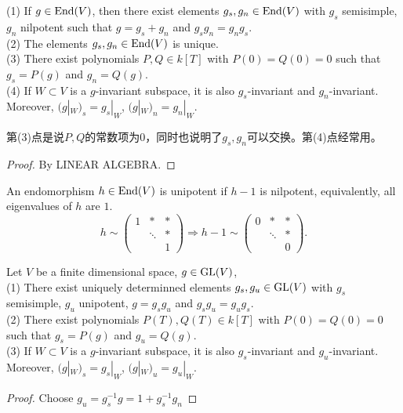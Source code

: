 \begin{prop}
	(1) If $g \in \mathrm{End}(V)$, then there exist elements $g_s,g_n\in \mathrm{End}(V)$ with $g_s$ semisimple, $g_n$ nilpotent such that $g=g_s+g_n$ and $g_sg_n=g_ng_s$.\\
	(2) The elements $g_s,g_n\in \mathrm{End}(V)$ is unique.\\
	(3) There exist polynomials $P,Q\in k[T]$ with $P(0)=Q(0)=0$ such that $g_s=P(g)$ and $g_n=Q(g)$.\\
	(4) If $W\subset V$ is a $g$-invariant subspace, it is also $g_s$-invariant and $g_n$-invariant. Moreover, $(g|_W)_s=g_s|_W$, $(g|_W)_n=g_n|_W$.
\end{prop}
第(3)点是说$P,Q$的常数项为$0$，同时也说明了$g_s,g_n$可以交换。第(4)点经常用。
\begin{proof}
	By LINEAR ALGEBRA.
\end{proof}
\begin{definition}
	An endomorphism $h\in \mathrm{End}(V)$ is unipotent if $h-1$ is nilpotent, equivalently, all eigenvalues of $h$ are $1$.
	\[h\sim  \begin{pmatrix}
	1 &*&*\\
	& \ddots &*\\
	 & & 1
\end{pmatrix}\Rightarrow h-1\sim  \begin{pmatrix}
	0 &*&*\\
	& \ddots &*\\
	 & & 0
\end{pmatrix}.\]
\end{definition}
\begin{corollary}
	Let $V$ be a finite dimensional space, $g\in \operatorname {GL}(V)$,\\
	(1) There exist uniquely determinned elements $g_s,g_u \in \operatorname {GL}(V)$ with $g_s$ semisimple, $g_u$ unipotent, $g=g_sg_u$ and $g_sg_u=g_ug_s$.\\
	(2) There exist polynomials $P(T),Q(T)\in k[T]$ with $P(0)=Q(0)=0$ such that $g_s=P(g)$ and $g_u=Q(g)$.\\
	(3) If $W\subset V$ is a $g$-invariant subspace, it is also $g_s$-invariant and $g_u$-invariant. Moreover, $(g|_W)_s=g_s|_W$, $(g|_W)_u=g_u|_W$.
\end{corollary}
\begin{proof}
	Choose $g_u=g_s^{-1}g=1+g_s^{-1}g_n$
\end{proof}